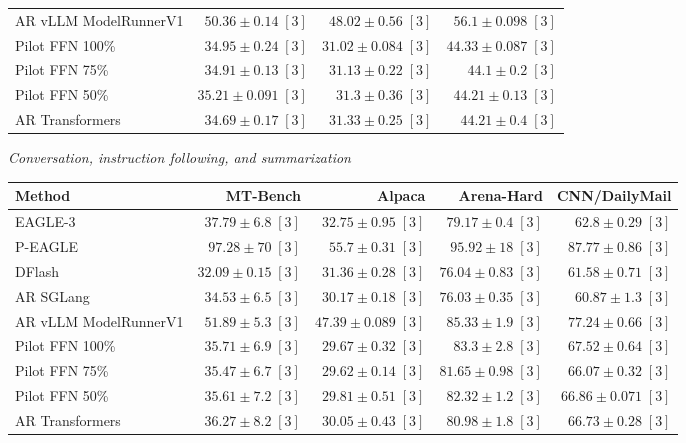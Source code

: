 \begin{table}[!htp]
\begin{tabular}{@{}>{\raggedright\arraybackslash}p{3.7cm}rrr@{}}
AR \textperiodcentered{} vLLM ModelRunnerV1 & \(50.36 \pm 0.14\;[3]\) & \(48.02 \pm 0.56\;[3]\) & \(56.1 \pm 0.098\;[3]\) \\
Pilot FFN 100\% & \(34.95 \pm 0.24\;[3]\) & \(31.02 \pm 0.084\;[3]\) & \(44.33 \pm 0.087\;[3]\) \\
Pilot FFN 75\% & \(34.91 \pm 0.13\;[3]\) & \(31.13 \pm 0.22\;[3]\) & \(44.1 \pm 0.2\;[3]\) \\
Pilot FFN 50\% & \(35.21 \pm 0.091\;[3]\) & \(31.3 \pm 0.36\;[3]\) & \(44.21 \pm 0.13\;[3]\) \\
AR \textperiodcentered{} Transformers & \(34.69 \pm 0.17\;[3]\) & \(31.33 \pm 0.25\;[3]\) & \(44.21 \pm 0.4\;[3]\) \\
\bottomrule
\end{tabular}\par\medskip
\textit{Conversation, instruction following, and summarization}\par\smallskip
\begin{tabular}{@{}>{\raggedright\arraybackslash}p{3.7cm}rrrr@{}}
\toprule
Method & MT-Bench & Alpaca & Arena-Hard & CNN/DailyMail \\
\midrule
EAGLE-3 & \(37.79 \pm 6.8\;[3]\) & \(32.75 \pm 0.95\;[3]\) & \(79.17 \pm 0.4\;[3]\) & \(62.8 \pm 0.29\;[3]\) \\
P-EAGLE & \(97.28 \pm 70\;[3]\) & \(55.7 \pm 0.31\;[3]\) & \(95.92 \pm 18\;[3]\) & \(87.77 \pm 0.86\;[3]\) \\
DFlash & \(\mathbf{32.09} \pm 0.15\;[3]\) & \(31.36 \pm 0.28\;[3]\) & \(76.04 \pm 0.83\;[3]\) & \(61.58 \pm 0.71\;[3]\) \\
AR \textperiodcentered{} SGLang & \(34.53 \pm 6.5\;[3]\) & \(30.17 \pm 0.18\;[3]\) & \(\mathbf{76.03} \pm 0.35\;[3]\) & \(\mathbf{60.87} \pm 1.3\;[3]\) \\
AR \textperiodcentered{} vLLM ModelRunnerV1 & \(51.89 \pm 5.3\;[3]\) & \(47.39 \pm 0.089\;[3]\) & \(85.33 \pm 1.9\;[3]\) & \(77.24 \pm 0.66\;[3]\) \\
Pilot FFN 100\% & \(35.71 \pm 6.9\;[3]\) & \(29.67 \pm 0.32\;[3]\) & \(83.3 \pm 2.8\;[3]\) & \(67.52 \pm 0.64\;[3]\) \\
Pilot FFN 75\% & \(35.47 \pm 6.7\;[3]\) & \(\mathbf{29.62} \pm 0.14\;[3]\) & \(81.65 \pm 0.98\;[3]\) & \(66.07 \pm 0.32\;[3]\) \\
Pilot FFN 50\% & \(35.61 \pm 7.2\;[3]\) & \(29.81 \pm 0.51\;[3]\) & \(82.32 \pm 1.2\;[3]\) & \(66.86 \pm 0.071\;[3]\) \\
AR \textperiodcentered{} Transformers & \(36.27 \pm 8.2\;[3]\) & \(30.05 \pm 0.43\;[3]\) & \(80.98 \pm 1.8\;[3]\) & \(66.73 \pm 0.28\;[3]\) \\

\end{tabular}
\end{table}
